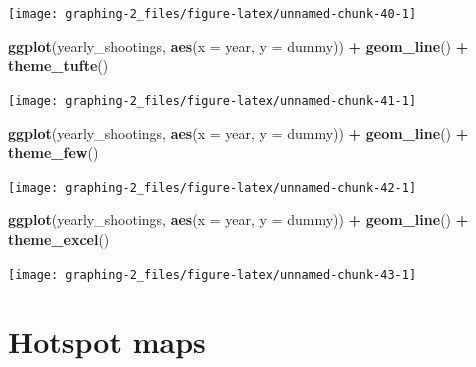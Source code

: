 \documentclass[
  12pt,
]{book}
\newenvironment{Shaded}{\begin{snugshade}}{\end{snugshade}}
\newcommand{\DataTypeTok}[1]{\textcolor[rgb]{0.13,0.29,0.53}{#1}}
\newcommand{\KeywordTok}[1]{\textcolor[rgb]{0.13,0.29,0.53}{\textbf{#1}}}
\newcommand{\NormalTok}[1]{#1}
\newcommand{\OperatorTok}[1]{\textcolor[rgb]{0.81,0.36,0.00}{\textbf{#1}}}
\newcommand{\StringTok}[1]{\textcolor[rgb]{0.31,0.60,0.02}{#1}}
\begin{document}
\begin{center}\texttt{[image: graphing-2\_files/figure-latex/unnamed-chunk-40-1]} \end{center}

\begin{Shaded}
\begin{Highlighting}[]
\KeywordTok{ggplot}\NormalTok{(yearly\_shootings, }\KeywordTok{aes}\NormalTok{(}\DataTypeTok{x =}\NormalTok{ year, }\DataTypeTok{y =}\NormalTok{ dummy)) }\OperatorTok{+}
\StringTok{  }\KeywordTok{geom\_line}\NormalTok{() }\OperatorTok{+}
\StringTok{  }\KeywordTok{theme\_tufte}\NormalTok{()}
\end{Highlighting}
\end{Shaded}

\begin{center}\texttt{[image: graphing-2\_files/figure-latex/unnamed-chunk-41-1]} \end{center}

\begin{Shaded}
\begin{Highlighting}[]
\KeywordTok{ggplot}\NormalTok{(yearly\_shootings, }\KeywordTok{aes}\NormalTok{(}\DataTypeTok{x =}\NormalTok{ year, }\DataTypeTok{y =}\NormalTok{ dummy)) }\OperatorTok{+}
\StringTok{  }\KeywordTok{geom\_line}\NormalTok{() }\OperatorTok{+}
\StringTok{  }\KeywordTok{theme\_few}\NormalTok{()}
\end{Highlighting}
\end{Shaded}

\begin{center}\texttt{[image: graphing-2\_files/figure-latex/unnamed-chunk-42-1]} \end{center}

\begin{Shaded}
\begin{Highlighting}[]
\KeywordTok{ggplot}\NormalTok{(yearly\_shootings, }\KeywordTok{aes}\NormalTok{(}\DataTypeTok{x =}\NormalTok{ year, }\DataTypeTok{y =}\NormalTok{ dummy)) }\OperatorTok{+}
\StringTok{  }\KeywordTok{geom\_line}\NormalTok{() }\OperatorTok{+}
\StringTok{  }\KeywordTok{theme\_excel}\NormalTok{()}
\end{Highlighting}
\end{Shaded}

\begin{center}\texttt{[image: graphing-2\_files/figure-latex/unnamed-chunk-43-1]} \end{center}

\hypertarget{hotspot-maps}{%
\chapter{Hotspot maps}\label{hotspot-maps}}
\end{document}
